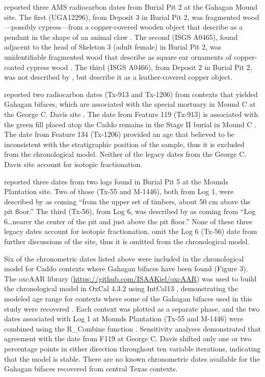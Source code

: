\documentclass[review]{elsarticle}
\begin{document}
\citet[Table 1]{RN4783} reported three AMS radiocarbon dates from Burial Pit 2 at the Gahagan Mound site. The first (UGA12296), from Deposit 3 in Burial Pit 2, was fragmented wood—possibly cypress—from a copper-covered wooden object that \citet[99, Plate 29, No. 2, Object 5]{RN5274} describe as a pendant in the shape of an animal claw \citep{RN4783}. The second (ISGS A0465), found adjacent to the head of Skeleton 3 (adult female) in Burial Pit 2, was unidentifiable fragmented wood that \citet[96, Plate 21 and 28, Nos. 2-3]{RN5274} describe as square ear ornaments of copper-coated cypress wood \citep{RN4783}. The third (ISGS A0466), from Deposit 2 in Burial Pit 2, was not described by \citet[96]{RN5274}, but \citet[62]{RN4783} describe it as a leather-covered copper object.

\citet[Table 1]{RN3714} reported two radiocarbon dates (Tx-913 and Tx-1206) from contexts that yielded Gahagan bifaces, which are associated with the special mortuary in Mound C at the George C. Davis site \citep[Table 5]{RN3714}. The date from Feature 119 (Tx-913) is associated with the green fill placed atop the Caddo remains in the Stage II burial in Mound C \citep{RN3714}. The date from Feature 134 (Tx-1206) provided an age that \citet{RN3714} believed to be inconsistent with the stratigraphic position of the sample, thus it is excluded from the chronological model. Neither of the legacy dates from the George C. Davis site account for isotopic fractionation.

\citet[72]{RN11561} reported three dates from two logs found in Burial Pit 5 at the Mounds Plantation site. Two of those (Tx-55 and M-1446), both from Log 1, were described by \citet[72]{RN11561} as coming “from the upper set of timbers, about 50 cm above the pit floor.” The third (Tx-56), from Log 6, was described by \citet[72]{RN11561} as coming from “Log 6…nearer the center of the pit and just above the pit floor.” None of these three legacy dates account for isotopic fractionation. \citet{RN11561} omit the Log 6 (Tx-56) date from further discussions of the site, thus it is omitted from the chronological model.

Six of the chronometric dates listed above were included in the chronological model for Caddo contexts where Gahagan bifaces have been found (Figure 3). The oxcAAR library (\href{https://github.com/ISAAKiel/oxcAAR}{https://github.com/ISAAKiel/oxcAAR}) was used to build the chronological model in OxCal 4.3.2 \citep{RN5514,RN20716} using IntCal13 \citep{RN4406}, demonstrating the modeled age range for contexts where some of the Gahagan bifaces used in this study were recovered \citep{RN20850}. Each context was plotted as a separate phase, and the two dates associated with Log 1 at Mounds Plantation (Tx-55 and M-1446) were combined using the R\_Combine function \citep{RN20850}. Sensitivity analyses demonstrated that agreement with the date from F119 at George C. Davis shifted only one or two percentage points in either direction throughout ten variable iterations, indicating that the model is stable. There are no known chronometric dates available for the Gahagan bifaces recovered from central Texas contexts.
\end{document}
